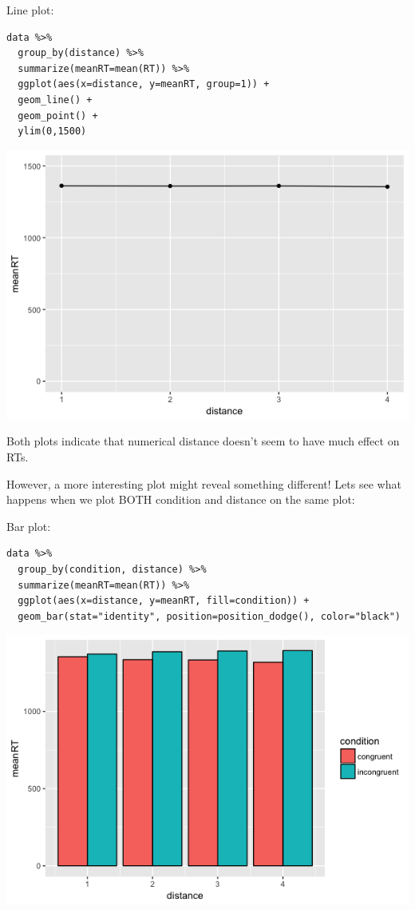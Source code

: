 \documentclass[11pt]{article}
\begin{document}
Line plot:

\begin{verbatim}
data %>%
  group_by(distance) %>%
  summarize(meanRT=mean(RT)) %>%
  ggplot(aes(x=distance, y=meanRT, group=1)) +
  geom_line() +
  geom_point() +
  ylim(0,1500)
\end{verbatim}

\includegraphics[width=.9\linewidth]{figures/week5/lineplot2.png}

Both plots indicate that numerical distance doesn't seem to have much effect on RTs.  

However, a more interesting plot might reveal something different!  Lets see what happens when we plot BOTH condition and distance on the same plot:

Bar plot:

\begin{verbatim}
data %>%
  group_by(condition, distance) %>%
  summarize(meanRT=mean(RT)) %>%
  ggplot(aes(x=distance, y=meanRT, fill=condition)) +
  geom_bar(stat="identity", position=position_dodge(), color="black")
\end{verbatim}

\includegraphics[width=.9\linewidth]{figures/week5/barplot3.png}
\end{document}

